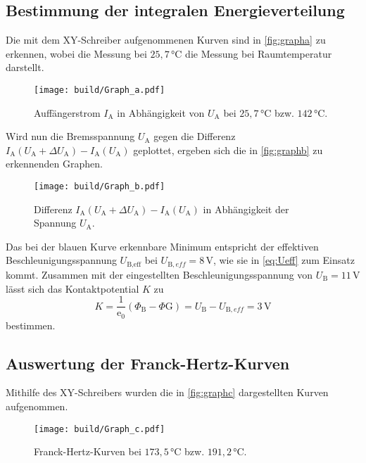 \subsection{Bestimmung der integralen Energieverteilung}

Die mit dem XY-Schreiber aufgenommenen Kurven sind in \autoref{fig:grapha} zu erkennen, wobei die Messung bei $25,7 \,\unit{\celsius}$ die Messung bei Raumtemperatur darstellt.

\begin{figure}[H]
    \centering
    \texttt{[image: build/Graph\_a.pdf]}
    \caption{Auffängerstrom $I_\text{A}$ in Abhängigkeit von $U_\text{A}$ bei $25,7 \,\unit{\celsius}$ bzw. $142 \,\unit{\celsius}$.}
    \label{fig:grapha}
\end{figure}

Wird nun die Bremsspannung $U_\text{A}$ gegen die Differenz $I_\text{A}(U_\text{A}+ \Delta U_\text{A}) - I_\text{A}(U_\text{A})$ geplottet, ergeben sich die in \autoref{fig:graphb} zu erkennenden Graphen.

\begin{figure}
    \centering
    \texttt{[image: build/Graph\_b.pdf]}
    \caption{Differenz $I_\text{A}(U_\text{A}+ \Delta U_\text{A}) - I_\text{A}(U_\text{A})$ in Abhängigkeit der Spannung $U_\text{A}$.}
    \label{fig:graphb}
\end{figure}

Das bei der blauen Kurve erkennbare Minimum entspricht der effektiven Beschleunigungsspannung $U_{\text{B},\text{eff}}$ bei $U_{\text{B},eff} = 8 \,\unit{\volt}$, wie sie in \eqref{eq:Ueff} zum Einsatz kommt.
Zusammen mit der eingestellten Beschleunigungsspannung von $U_\text{B} = 11 \,\unit{\volt}$ lässt sich das Kontaktpotential $K$ zu
\begin{equation*}
    K = \frac{1}{\text{e}_0} (\Phi_\text{B} - \Phi\text{G}) = U_\text{B} - U_{\text{B},eff} = 3 \,\unit{\volt} %
\end{equation*}
bestimmen.


\subsection{Auswertung der Franck-Hertz-Kurven}

Mithilfe des XY-Schreibers wurden die in \autoref{fig:graphc} dargestellten Kurven aufgenommen.

\begin{figure}
    \centering
    \texttt{[image: build/Graph\_c.pdf]}
    \caption{Franck-Hertz-Kurven bei $173,5 \,\unit{\celsius}$ bzw. $191,2 \,\unit{\celsius}$.}
    \label{fig:graphc}
\end{figure}

